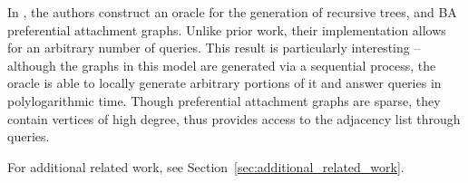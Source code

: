 In \cite{reut}, the authors construct an oracle for the generation of recursive trees, and BA preferential attachment graphs.
Unlike prior work, their implementation allows for an arbitrary number of queries.
This result is particularly interesting --  although the graphs in this model are generated via a sequential process,
the oracle is able to locally generate arbitrary portions of it and answer queries in polylogarithmic time.
Though preferential attachment graphs are sparse, they contain vertices of high degree,
thus \cite{reut} provides access to the adjacency list through  queries.

For additional related work, see Section~\ref{sec:additional_related_work}.
